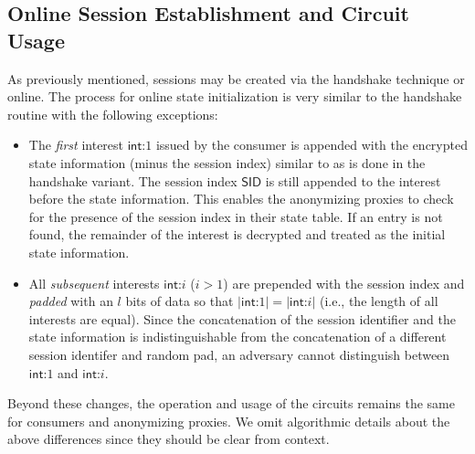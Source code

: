 \subsection{Online Session Establishment and Circuit Usage} \label{sec:piggyback}
As previously mentioned, sessions may be created via the handshake technique or online. The process for online state initialization is very similar to the handshake routine with the following exceptions:
\begin{itemize}
  \item The \emph{first} interest $\mathsf{int}$:$1$ issued by the consumer is appended with the encrypted state information (minus the session index) similar to as is done in the handshake variant. The session index $\mathsf{SID}$ is still appended to the interest before the state information. This enables the anonymizing proxies to check for the presence of the session index in their state table. If an entry is not found, the remainder of the interest is decrypted and treated as the initial state information.
  \item All \emph{subsequent} interests $\mathsf{int}$:$i$ ($i > 1$) are prepended with the session index and \emph{padded} with an $l$ bits of data so that $|\mathsf{int}$:$1| = |\mathsf{int}$:$i|$ (i.e., the length of all interests are equal). Since the concatenation of the session identifier and the state information is indistinguishable from the concatenation of a different session identifer and random pad, an adversary cannot distinguish between $\mathsf{int}$:$1$ and $\mathsf{int}$:$i$.
\end{itemize}
Beyond these changes, the operation and usage of the circuits remains the same for consumers and anonymizing proxies. We omit algorithmic details about the above differences since they should be clear from context.

